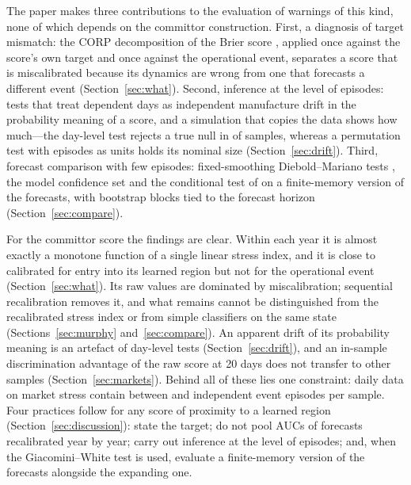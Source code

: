 \documentclass[preprint,12pt,authoryear]{elsarticle}
\begin{document}
The paper makes three contributions to the evaluation of warnings of this kind, none of which depends on the committor construction. First, a diagnosis of target mismatch: the CORP decomposition of the Brier score \citep{dimitriadis2021}, applied once against the score's own target and once against the operational event, separates a score that is miscalibrated because its dynamics are wrong from one that forecasts a different event (Section~\ref{sec:what}). Second, inference at the level of episodes: tests that treat dependent days as independent manufacture drift in the probability meaning of a score, and a simulation that copies the data shows how much---the day-level test rejects a true null in \SizeChiFive of samples, whereas a permutation test with episodes as units holds its nominal size (Section~\ref{sec:drift}). Third, forecast comparison with few episodes: fixed-smoothing Diebold--Mariano tests \citep{lazarus2018,coroneo2020}, the model confidence set \citep{hansen2011} and the conditional test of \citet{giacomini2006} on a finite-memory version of the forecasts, with bootstrap blocks tied to the forecast horizon (Section~\ref{sec:compare}).

For the committor score the findings are clear. Within each year it is almost exactly a monotone function of a single linear stress index, and it is close to calibrated for entry into its learned region but not for the operational event (Section~\ref{sec:what}). Its raw values are dominated by miscalibration; sequential recalibration removes it, and what remains cannot be distinguished from the recalibrated stress index or from simple classifiers on the same state (Sections~\ref{sec:murphy} and~\ref{sec:compare}). An apparent drift of its probability meaning is an artefact of day-level tests (Section~\ref{sec:drift}), and an in-sample discrimination advantage of the raw score at 20 days does not transfer to other samples (Section~\ref{sec:markets}). Behind all of these lies one constraint: daily data on market stress contain between \EpisMin and \EpisMax independent event episodes per sample. Four practices follow for any score of proximity to a learned region (Section~\ref{sec:discussion}): state the target; do not pool AUCs of forecasts recalibrated year by year; carry out inference at the level of episodes; and, when the Giacomini--White test is used, evaluate a finite-memory version of the forecasts alongside the expanding one.
\end{document}
